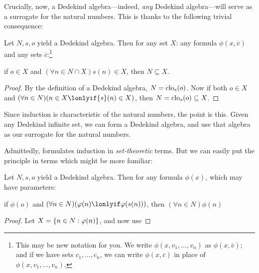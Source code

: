 \documentclass[../../../include/open-logic-section]{subfiles}
\begin{document}

Crucially, now, a Dedekind algebra---indeed, \emph{any} Dedekind
algebra---will serve as a surrogate for the natural numbers. This is
thanks to the following trivial consequence:

\begin{thm}
Let $N, s, o$ yield a Dedekind algebra. Then for any set $X$: %
any formula $\phi(x, \overline{v})$ and any sets
$\overline{c}$:\footnote{This may be new notation for you. We write
$\phi(x, v_1, \ldots, v_n)$ as $\phi(x, \overline{v})$; and if we have
sets $c_1, \ldots, c_n$, we can write $\phi(x, \overline{c})$ in place
of $\phi(x, v_1, \ldots, v_n)$.} 
	\begin{center}
		if $o \in X$ and $(\forall {n} \in N \cap X){s}({n}) \in X$, {then} $N \subseteq X$.
	\end{center}
\end{thm}

\begin{proof}
By the definition of a Dedekind algebra, $N = \mathrm{clo}_{s}(o)$.
Now if both ${o} \in X$ and $(\forall {n} \in N)(n \in X \lonlyif
{s}({n}) \in X)$, then $N = \mathrm{clo}_{s}(o) \subseteq X$.
\end{proof}

Since induction is characteristic of the natural numbers, the point is
this. Given any Dedekind infinite set, we can form a Dedekind algebra,
and use that algebra as our surrogate for the natural numbers. 

Admittedly,  formulates induction in
\emph{set-theoretic} terms. But we can easily put the principle in
terms which might be more familiar:

\begin{cor}
Let $N, s, o$ yield a Dedekind algebra. Then for any formula
$\phi(x)$, which may have parameters:
\begin{center}
	if $\phi(o)$ and $(\forall {n} \in N)(\phi(n)\lonlyif
	\phi({s}({n})))$, {then} $(\forall n \in N)\phi(n)$
\end{center}
\end{cor}

\begin{proof}
Let $X = \{ n \in N : \varphi(n) \}$, and now use
\end{proof}
\end{document}
